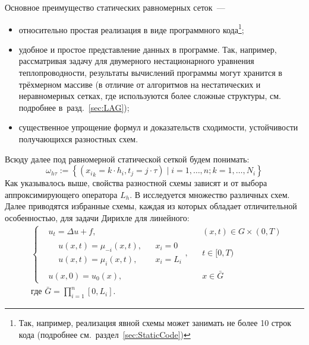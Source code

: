 Основное преимущество статических равномерных сеток~--- 
\begin{itemize}
    \item относительно простая реализация в виде программного кода\footnote{Так, например, реализация явной схемы может занимать не более 10 строк кода (подробнее см.~раздел~\ref{sec:StaticCode})};
    \item удобное и простое представление данных в программе. Так, например, рассматривая задачу для двумерного нестационарного уравнения теплопроводности, результаты вычислений программы могут хранится в трёхмерном массиве (в отличие от алгоритмов на нестатических и неравномерных сетках, где используются более сложные структуры, см. подробнее в~разд.~\ref{sec:LAG});
    \item существенное упрощение формул и доказательств сходимости, устойчивости получающихся разностных схем.
\end{itemize}
Всюду далее под равномерной статической сеткой будем понимать:
\begin{equation*}
    \omega_{h\tau} := \left\{ 
        ({x_i}_k = k \cdot h_i, t_j = j \cdot \tau) \mid 
        i = 1, \ldots, n; k = 1, \ldots, N_i
     \right\}
\end{equation*}
Как указывалось выше, свойства разностной схемы зависят и от выбора аппроксимирующего оператора $L_h$.
В \cite{СамарскийТеорияРазностныхСхем} исследуется множество различных схем.
Далее приводятся избранные схемы, каждая из которых обладает отличительной особенностью, для задачи Дирихле для линейного:
\begin{equation*}
    \begin{aligned}
        &\left\{ 
            \begin{aligned}
                & u_t = \Delta u + f, && (x, t) \in G \times (0, T)\\
                & \begin{aligned}
                    & u(x, t) = \mu_{-i}(x, t), && x_i = 0\\
                    & u(x, t) = \mu_{i}(x, t), && x_i = L_i
                \end{aligned}, && t \in [0, T)\\
                &u(x, 0) = u_0(x), && x \in \bar{G}
            \end{aligned}
        \right.\\
        &\text{где } \bar{G} = \prod\limits_{i=1}^{n} [0, L_i].
    \end{aligned}
\end{equation*}
